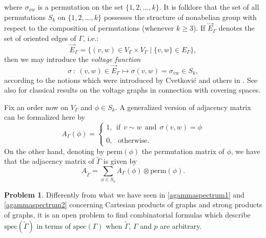 \documentclass{amsart}
\theoremstyle{definition}
\newtheorem{problem}[theo]{Problem}
\numberwithin{equation}{section}
\begin{document}
where $\sigma_{vw}$ is a permutation on the set $\{1,2, \ldots, k\}$. It is folklore  that the set of all permutations $S_k$ on  $\{1,2, \ldots, k\}$ possesses the structure of nonabelian group with respect to the composition of permutations (whenever $k \ge 3$).  If $\vec{E}_\Gamma$ denotes the set of  oriented edges of $\Gamma$, i.e.: 
\begin{equation}
    \vec{E}_\Gamma = \{(v,w) \in V_{\Gamma} \times V_{\Gamma} \mid \{v,w\} \in E_{\Gamma}\},
\end{equation} 
then we may introduce the \textit{voltage function}\begin{equation}
     \sigma \ : \  (v,w) \in \vec{E}_\Gamma \longmapsto \sigma(v,w) = \sigma_{vw} \in S_k,    
\end{equation}
according to the notions which were introduced by Cvetkovi\'{c} and others in \cite{neps1, crs, neps2}. See also \cite[Chapters 2, 5]{gross2} for classical results on the voltage graphs in connection with covering spaces.

Fix an order now on  $V_\Gamma$ and  $\phi \in S_k$.  A generalized version of adjacency matrix  can be formalized here by
\begin{equation}
A_\Gamma(\phi)= \begin{cases}  1, \ \  \mbox{if}  \ \ v \sim w \ \ \mbox{and} \ \ \sigma(v,w) = \phi\\ 
\\
0, \ \ \ \mbox{otherwise}.
\end{cases}
\end{equation} On the other hand, denoting by $\mathrm{perm}(\phi)$ the permutation matrix of $\phi$, we have that the adjacency matrix of $\widetilde{\Gamma}$ is given by
\begin{equation}\label{agammaextra}
    A_{\widetilde{\Gamma}} = \sum\limits_{\phi \in S_k} A_{\Gamma}(\phi) \otimes \mathrm{perm}(\phi).
\end{equation}

\begin{problem}Differently  from what we have seen in  \eqref{agammaspectrum1}  and \eqref{agammaspectrum2} concerning Cartesian products of graphs and strong products of graphs, it is an open problem to find combinatorial formulas which describe $\mathrm{spec}(\widetilde{\Gamma})$ in terms of $\mathrm{spec}(\Gamma)$ when $\widetilde{\Gamma}$, $\Gamma$ and $p$ are arbitrary.
\end{problem}
\end{document}
